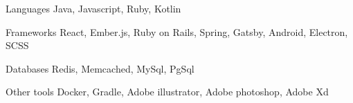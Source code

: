 
\begin{cvskills}
  \cvskill
    {Languages} %
    {Java, Javascript, Ruby, Kotlin} %

  \cvskill
    {Frameworks} %
    {React, Ember.js, Ruby on Rails, Spring, Gatsby, Android, Electron, SCSS} %

  \cvskill
    {Databases} %
    {Redis, Memcached, MySql, PgSql} %

  \cvskill
    {Other tools} %
    {Docker, Gradle, Adobe illustrator, Adobe photoshop, Adobe Xd} %
  
\end{cvskills}
